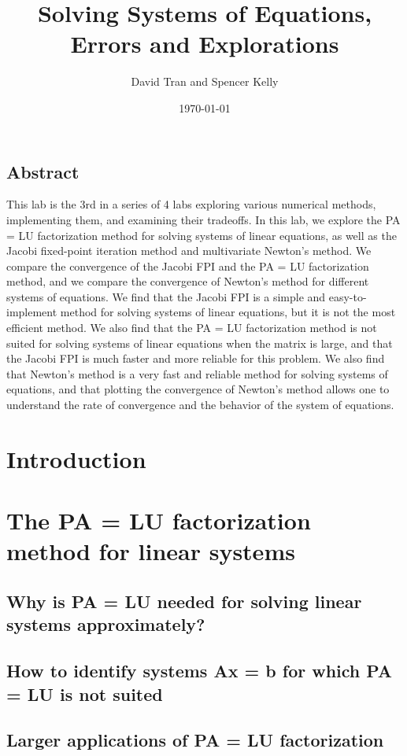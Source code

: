 \documentclass[11pt]{article}
\title{Solving Systems of Equations, Errors and Explorations}
\author{David Tran and Spencer Kelly}
\date{\today}
\begin{document}
\maketitle

\subsection*{Abstract}
This lab is the 3rd in a series of 4 labs exploring various numerical methods, implementing them, and examining their tradeoffs. In this lab, we explore the PA = LU factorization method for solving systems of linear equations, as well as the Jacobi fixed-point iteration method and multivariate Newton's method. We compare the convergence of the Jacobi FPI and the PA = LU factorization method, and we compare the convergence of Newton's method for different systems of equations. We find that the Jacobi FPI is a simple and easy-to-implement method for solving systems of linear equations, but it is not the most efficient method. We also find that the PA = LU factorization method is not suited for solving systems of linear equations when the matrix is large, and that the Jacobi FPI is much faster and more reliable for this problem. We also find that Newton's method is a very fast and reliable method for solving systems of equations, and that plotting the convergence of Newton's method allows one to understand the rate of convergence and the behavior of the system of equations.

\section{Introduction}


\section{The PA = LU factorization method for linear systems}

\subsection{Why is PA = LU needed for solving linear systems approximately?}

\subsection{How to identify systems Ax = b for which PA = LU is not suited}

\subsection{Larger applications of PA = LU factorization}
\end{document}
